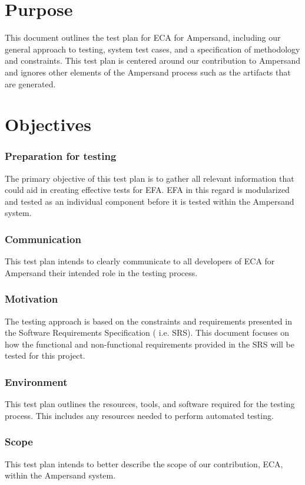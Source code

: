\documentclass[12pt]{report}
\begin{document}
\section{Purpose}\label{sec:Purpose}
This document outlines the test plan for ECA for Ampersand, including our
general approach to testing, system test cases, and a specification of
methodology and constraints. This test plan is centered around our contribution 
to Ampersand and ignores other elements of the Ampersand process such as the 
artifacts that are generated.

\section{Objectives}\label{sec:Objectives}
\subsubsection*{Preparation for testing}
The primary objective of this test plan is to gather all relevant information 
that could aid in creating effective tests for EFA. EFA in this regard is 
modularized and tested as an individual component before it is tested within 
the Ampersand system. 

\subsubsection*{Communication}
This test plan intends to clearly communicate to all developers of ECA for 
Ampersand their intended role in the testing process. 

\subsubsection*{Motivation}
The testing approach is based on the constraints and requirements presented in 
the Software Requirements Specification \big( i.e. SRS\big). This document 
focuses on 
how the functional and non-functional requirements provided in the SRS will be 
tested for this project.

\subsubsection*{Environment}
This test plan outlines the resources, tools, and software required for the
testing process. This includes any resources needed to perform automated testing. 

\subsubsection*{Scope}
This test plan intends to better describe the scope of our contribution, ECA,
within the Ampersand system. 
\end{document}
